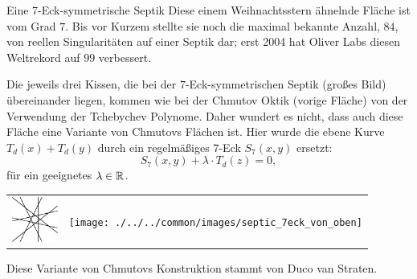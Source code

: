 \begin{surferPage}[7-Eck]{Eine 7-Eck-symmetrische Septik}
  Diese einem Weihnachtsstern ähnelnde Fläche ist vom Grad $7$.  
    Bis vor Kurzem stellte sie noch die maximal bekannte Anzahl, $84$, von reellen
    Singularitäten auf einer Septik dar;
    erst 2004 hat Oliver Labs diesen Weltrekord auf $99$ verbessert. 

    Die jeweils drei Kissen, die bei der $7$-Eck-symmetrischen Septik (großes
    Bild) 
    übereinander liegen, kommen wie bei der 
    Chmutov Oktik (vorige Fläche) von der Verwendung der Tchebychev Polynome.
    Daher wundert es nicht, dass auch diese Fläche eine Variante von
    Chmutovs Flächen ist. 
    Hier wurde die ebene Kurve $T_d(x)+T_d(y)$
    durch ein regelmäßiges $7$-Eck $S_7(x,y)$ ersetzt:
    \[S_7(x,y) + \lambda \cdot T_d(z) = 0,\]
    für ein geeignetes $\lambda\in{\mathbb R}$. 
    \vspace*{-0.3em}
    \begin{center}
      \begin{tabular}{c@{\qquad}c}
        \includegraphics[height=1.5cm]{./../../common/images/labsseptic1.pdf}
        &
        \texttt{[image: ./../../common/images/septic\_7eck\_von\_oben]}
      \end{tabular}
    \end{center}
    \vspace*{-0.3em}    
   Diese Variante von Chmutovs Konstruktion stammt von Duco van
    Straten. 
\end{surferPage}

